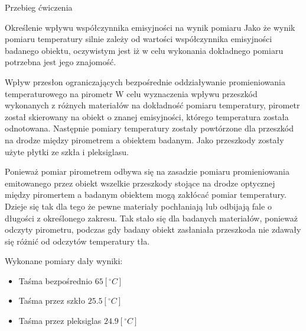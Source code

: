\documentclass[12pt]{article}
\begin{document}
\begin{section}{Przebieg ćwiczenia}
\begin{subsection}{Określenie wpływu współczynnika emisyjności na wynik
	pomiaru}
		Jako że wynik pomiaru temperatury silnie zależy od wartości współczynnika
		emisyjności badanego obiektu, oczywistym jest iż w celu wykonania dokładnego
		pomiaru potrzebna jest jego znajomość.
	\end{subsection}
	
	\newpage
	
	\begin{subsection}{Wpływ przesłon ograniczających bezpośrednie oddziaływanie
					promieniowania temperaturowego na pirometr}
		W celu wyznaczenia wpływu przeszkód wykonanych z różnych materiałów na
		dokładność pomiaru temperatury, pirometr został skierowany na obiekt o znanej
		emisyjności, którego temperatura została odnotowana. Następnie pomiary
		temperatury zostały powtórzone dla przeszkód na drodze między pirometrem a
		obiektem badanym. Jako przeszkody zostały użyte płytki ze szkła i pleksiglasu.
					
		Ponieważ pomiar pirometrem odbywa się na zasadzie pomiaru promieniowania
		emitowanego przez obiekt wszelkie przeszkody stojące na drodze optycznej
		między piromertem a badanym obiektem mogą zakłócać pomiar temperatury. Dzieje
		się tak dla tego że pewne materiały pochłaniają lub odbijają fale o długości z
		określonego zakresu. Tak stało się dla badanych materiałów, ponieważ odczyty
		pirometru, podczas gdy badany obiekt zasłaniała przeszkoda nie zdawały się
		różnić od odczytów temperatury tła.
		
		Wykonane pomiary dały wyniki:
		\begin{itemize}
		  \item Taśma bezpośrednio $65[^{\circ}C]$
		  \item Taśma przez szkło $25.5[^{\circ}C]$
		  \item Taśma przez pleksiglas $24.9[^{\circ}C]$
		\end{itemize}
		
	\end{subsection}
	
	\newpage
	

\end{section}
\end{document}
